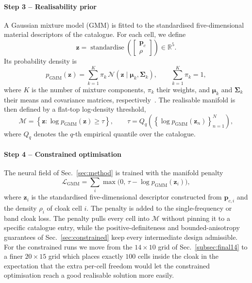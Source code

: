 \documentclass[preprint,12pt]{elsarticle}
\newcommand{\mbf}[1]{\mathbf{#1}}
\newcommand{\be}{\begin{equation}}
\newcommand{\ee}{\end{equation}}
\newcommand{\mcl}[1]{\mathcal{#1}}
\begin{document}
\paragraph{Step 3 -- Realisability prior}
A Gaussian mixture model (GMM) is fitted to the standardised
five-dimensional material descriptors of the catalogue. For each cell,
we define
\be\label{eq:standardised_descriptor}
  \mbf{z}
  =
  \operatorname{standardise}
  \left(
    \begin{bmatrix}
      \mbf{p}_c\\
      \rho
    \end{bmatrix}
  \right)
  \in\mathbb{R}^{5}.
\ee
Its probability density is
\be\label{eq:gmm_density}
  p_{\mathrm{GMM}}(\mbf{z})
  =
  \sum_{k=1}^{K}\pi_k\,
  \mcl{N}\!\left(\mbf{z}\mid\boldsymbol{\mu}_k,\boldsymbol{\Sigma}_k\right),
  \qquad
  \sum_{k=1}^{K}\pi_k=1,
\ee
where $K$ is the number of mixture components, $\pi_k$ their weights, and
$\boldsymbol{\mu}_k$ and $\boldsymbol{\Sigma}_k$ their means and covariance
matrices, respectively~\citep{mclachlan2000}. The realisable manifold is then
defined by a flat-top log-density threshold,
\be\label{eq:gmm_manifold}
  \mcl{M}
  =
  \left\{\mbf{z}:\log p_{\mathrm{GMM}}(\mbf{z})\ge\tau\right\},
  \qquad
  \tau
  =
  Q_q\!\left(
    \left\{\log p_{\mathrm{GMM}}(\mbf{z}_n)\right\}_{n=1}^{N}
  \right),
\ee
where $Q_q$ denotes the $q$-th empirical quantile over the catalogue.

\paragraph{Step 4 -- Constrained optimisation} The neural field of
Sec.~\ref{sec:method} is trained with the manifold penalty
\be\label{eq:gmm_pen}
  \mcl{L}_{\mathrm{GMM}}
  =
  \sum_i
  \max\!\bigl(
    0,\,
    \tau-\log p_{\mathrm{GMM}}(\mbf{z}_i)
  \bigr),
\ee
where $\mbf{z}_i$ is the standardised five-dimensional descriptor
constructed from $\mbf{p}_{c,i}$ and the density $\rho_i$ of cloak
cell $i$. The penalty is added to the single-frequency or band cloak
loss. The penalty pulls every cell
into $\mcl{M}$ without pinning it to a specific catalogue entry, while the
positive-definiteness and bounded-anisotropy guarantees of
Sec.~\ref{sec:constrained} keep every intermediate design admissible. For the
constrained runs we move from the $14\times10$ grid of Sec.~\ref{subsec:final14}
to a finer $20\times15$ grid  which places exactly $100$ cells inside the
cloak in the expectation that the extra per-cell freedom would let the
constrained optimisation reach a good realisable solution more easily.
\end{document}
